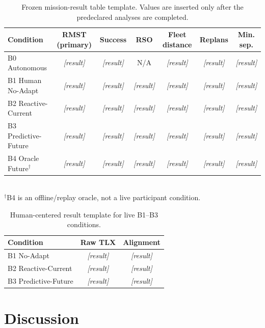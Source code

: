 \documentclass[conference]{IEEEtran}
\newcommand{\TBD}[1]{\textit{[#1]}}
\begin{document}
\begin{table}[t]
\centering
\caption{Frozen mission-result table template. Values are inserted only after
the predeclared analyses are completed.}
\label{tab:result_template}
\small
\setlength{\tabcolsep}{4pt}
\begin{tabular}{lcccccc}
\toprule
Condition & RMST (primary) & Success & RSO & Fleet distance & Replans & Min. sep.\\
\midrule
B0 Autonomous & \TBD{result} & \TBD{result} & N/A & \TBD{result} & \TBD{result} & \TBD{result}\\
B1 Human No-Adapt & \TBD{result} & \TBD{result} & \TBD{result} & \TBD{result} & \TBD{result} & \TBD{result}\\
B2 Reactive-Current & \TBD{result} & \TBD{result} & \TBD{result} & \TBD{result} & \TBD{result} & \TBD{result}\\
B3 Predictive-Future & \TBD{result} & \TBD{result} & \TBD{result} & \TBD{result} & \TBD{result} & \TBD{result}\\
B4 Oracle Future$^{\dagger}$ & \TBD{result} & \TBD{result} & \TBD{result} & \TBD{result} & \TBD{result} & \TBD{result}\\
\bottomrule
\end{tabular}
\\
\footnotesize{$^{\dagger}$B4 is an offline/replay oracle, not a live participant condition.}
\end{table}

\begin{table}[t]
\centering
\caption{Human-centered result template for live B1--B3 conditions.}
\label{tab:hri_result_template}
\footnotesize
\setlength{\tabcolsep}{3pt}
\begin{tabular}{lcc}
\toprule
Condition & Raw TLX & Alignment\\
\midrule
B1 No-Adapt & \TBD{result} & \TBD{result}\\
B2 Reactive-Current & \TBD{result} & \TBD{result}\\
B3 Predictive-Future & \TBD{result} & \TBD{result}\\
\bottomrule
\end{tabular}
\end{table}

\section{Discussion}
\end{document}
